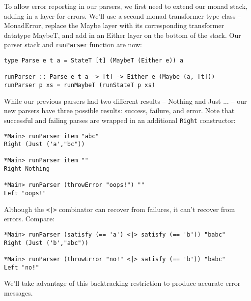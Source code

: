 \documentclass{tmr}
\begin{document}
To allow error reporting in our parsers, we first need to extend our monad stack, 
adding in a layer for errors.  We'll use a second monad transformer type class 
-- MonadError, replace the Maybe layer with its corresponding transformer datatype 
MaybeT, and add in an Either layer on the bottom of the stack.  Our parser stack 
and \verb+runParser+ function are now:
\begin{verbatim}
type Parse e t a = StateT [t] (MaybeT (Either e)) a

runParser :: Parse e t a -> [t] -> Either e (Maybe (a, [t]))
runParser p xs = runMaybeT (runStateT p xs)
\end{verbatim}

While our previous parsers had two different results -- Nothing and Just ... --
our new parsers have three possible results:  success, failure, and error.  Note
that successful and failing parses are wrapped in an additional \verb+Right+
constructor:
\begin{verbatim}
*Main> runParser item "abc"
Right (Just ('a',"bc"))

*Main> runParser item ""
Right Nothing

*Main> runParser (throwError "oops!") ""
Left "oops!"
\end{verbatim}

Although the \verb+<|>+ combinator can recover from failures, it can't recover from
errors.  Compare:
\begin{verbatim}
*Main> runParser (satisfy (== 'a') <|> satisfy (== 'b')) "babc"
Right (Just ('b',"abc"))

*Main> runParser (throwError "no!" <|> satisfy (== 'b')) "babc"
Left "no!"
\end{verbatim}
We'll take advantage of this backtracking restriction to produce accurate error
messages.
\end{document}
